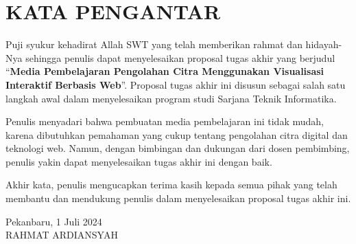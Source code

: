 \chapter*{KATA PENGANTAR}

Puji syukur kehadirat Allah SWT yang telah memberikan rahmat dan hidayah-Nya sehingga penulis dapat menyelesaikan proposal tugas akhir yang berjudul ``\textbf{Media Pembelajaran Pengolahan Citra Menggunakan Visualisasi Interaktif Berbasis Web}''. Proposal tugas akhir ini disusun sebagai salah satu langkah awal dalam menyelesaikan program studi Sarjana Teknik Informatika.

Penulis menyadari bahwa pembuatan media pembelajaran ini tidak mudah, karena dibutuhkan pemahaman yang cukup tentang pengolahan citra digital dan teknologi web. Namun, dengan bimbingan dan dukungan dari dosen pembimbing, penulis yakin dapat menyelesaikan tugas akhir ini dengan baik.

Akhir kata, penulis mengucapkan terima kasih kepada semua pihak yang telah membantu dan mendukung penulis dalam menyelesaikan proposal tugas akhir ini.

\vspace{1cm}
\begin{flushright}
    Pekanbaru, 1 Juli 2024\\
    \vspace{2.5cm}
    {RAHMAT ARDIANSYAH}\\
\end{flushright}

